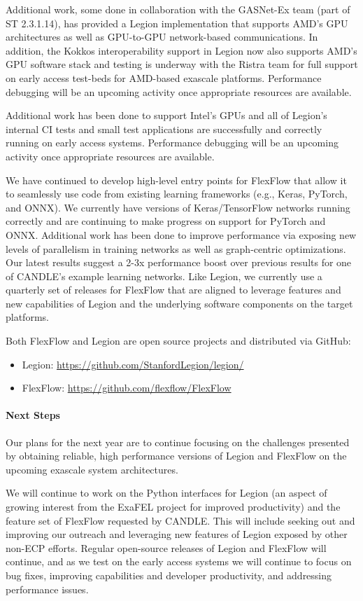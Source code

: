 Additional work, some done in collaboration with the GASNet-Ex team
(part of ST 2.3.1.14), has provided a Legion implementation that
supports AMD's GPU architectures as well as GPU-to-GPU network-based
communications.  In addition, the Kokkos interoperability support in
Legion now also supports AMD's GPU software stack and testing is
underway with the Ristra team for full support on early access
test-beds for AMD-based exascale platforms.  Performance debugging will
be an upcoming activity once appropriate resources are available.

Additional work has been done to support Intel's GPUs and all of
Legion's internal CI tests and small test applications are
successfully and correctly running on early access systems.
Performance debugging will be an upcoming activity once appropriate
resources are available.

We have continued to develop high-level entry points for FlexFlow that
allow it to seamlessly use code from existing learning frameworks (e.g.,
Keras, PyTorch, and ONNX).  We currently have versions of Keras/TensorFlow
networks running correctly and are continuing to make progress on support
for PyTorch and ONNX.   Additional work has been done to improve performance
via exposing new levels of parallelism in training networks as well as
graph-centric optimizations.  Our latest results suggest a 2-3x performance
boost over previous results for one of CANDLE's example learning networks.
Like Legion, we currently use a quarterly set of releases for FlexFlow that
are aligned to leverage features and new capabilities of Legion and the
underlying software components on the target platforms. 

Both FlexFlow and Legion are open source projects and distributed via GitHub:

\begin{itemize}
  \item Legion: \url{https://github.com/StanfordLegion/legion/}
  \item FlexFlow: \url{https://github.com/flexflow/FlexFlow} 
\end{itemize}

\paragraph{Next Steps}

Our plans for the next year are to continue focusing on the challenges
presented by obtaining reliable, high performance versions of Legion and
FlexFlow on the upcoming exascale system architectures.  

We will continue to work on the Python interfaces for Legion (an aspect
of growing interest from the ExaFEL project for improved productivity)
and the feature set of FlexFlow requested by CANDLE.  This will include
seeking out and improving our outreach and leveraging new features of
Legion exposed by other non-ECP efforts.  Regular open-source releases of
Legion and FlexFlow will continue, and as we test on the early access
systems we will continue to focus on bug fixes, improving capabilities and 
developer productivity, and addressing performance issues. 




